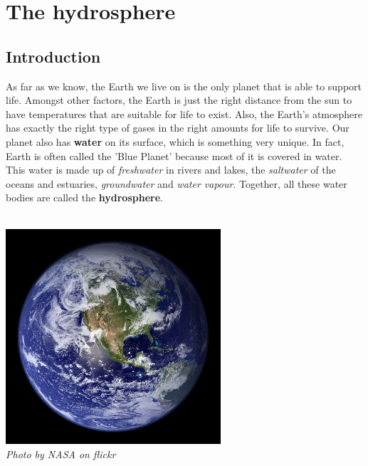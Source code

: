         \chapter{The hydrosphere}
    \setcounter{figure}{1}
    \setcounter{subfigure}{1}
    \label{m38138}
    \section{Introduction}
            \nopagebreak
\begin{minipage}{.7\textwidth}
      \label{m38138*id334056}As far as we know, the Earth we live on is the only planet that is able to support life. Amongst other factors, the Earth is just the right distance from the sun to have temperatures that are suitable for life to exist. Also, the Earth's atmosphere has exactly the right type of gases in the right amounts for life to survive. Our planet also has \textbf{water} on its surface, which is something very unique. In fact, Earth is often called the 'Blue Planet' because most of it is covered in water. This water is made up of \textsl{freshwater} in rivers and lakes, the \textsl{saltwater} of the oceans and estuaries, \textsl{groundwater} and \textsl{water vapour}. Together, all these water bodies are called the \textbf{hydrosphere}.\par 
{}
\end{minipage}
\begin{minipage}{.3\textwidth}
\begin{center}
\\
 \includegraphics[width=0.6\textwidth]{photos/earth_space_nasa-flickr.jpg}\\
\textsl{Photo by NASA on flickr}
\end{center}

\end{minipage}

